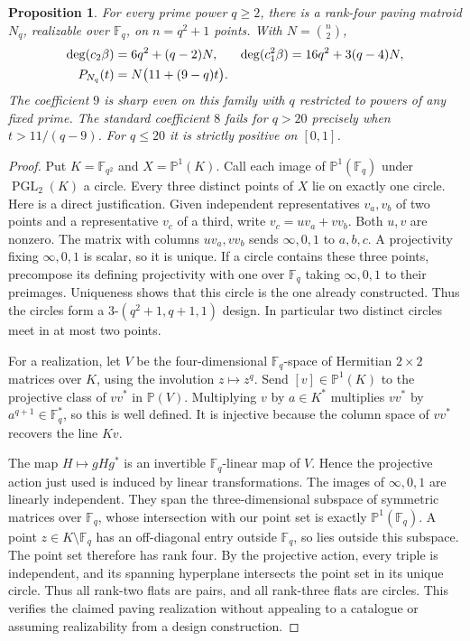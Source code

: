 \documentclass[12pt]{amsart}
\newtheorem{prop}[thm]{Proposition}
\theoremstyle{definition}
\theoremstyle{remark}
\numberwithin{equation}{section}
\begin{document}
\begin{prop}\label{en-inversive}
For every prime power $q\geq2$, there is a rank-four paving matroid $N_q$, realizable over $\mathbb F_q$, on $n=q^2+1$ points. With $N=\binom n2$,
\begin{align}\label{en-inversive-chern}
 \deg(c_2\beta)&=6q^2+(q-2)N,&
 \deg(c_1^2\beta)&=16q^2+3(q-4)N,\notag\\
 P_{N_q}(t)&=N\bigl(11+(9-q)t\bigr).
\end{align}
The coefficient $9$ is sharp even on this family with $q$ restricted to powers of any fixed prime. The standard coefficient $8$ fails for $q>20$ precisely when $t>11/(q-9)$. For $q\leq20$ it is strictly positive on $[0,1]$.
\end{prop}
\begin{proof}
Put $K=\mathbb F_{q^2}$ and $X=\mathbb P^1(K)$. Call each image of $\mathbb P^1(\mathbb F_q)$ under $\operatorname{PGL}_2(K)$ a circle. Every three distinct points of $X$ lie on exactly one circle. Here is a direct justification. Given independent representatives $v_a,v_b$ of two points and a representative $v_c$ of a third, write $v_c=u v_a+v v_b$. Both $u,v$ are nonzero. The matrix with columns $u v_a,v v_b$ sends $\infty,0,1$ to $a,b,c$. A projectivity fixing $\infty,0,1$ is scalar, so it is unique. If a circle contains these three points, precompose its defining projectivity with one over $\mathbb F_q$ taking $\infty,0,1$ to their preimages. Uniqueness shows that this circle is the one already constructed. Thus the circles form a $3$-$(q^2+1,q+1,1)$ design. In particular two distinct circles meet in at most two points.

For a realization, let $V$ be the four-dimensional $\mathbb F_q$-space of Hermitian $2\times2$ matrices over $K$, using the involution $z\mapsto z^q$. Send $[v]\in\mathbb P^1(K)$ to the projective class of $vv^*$ in $\mathbb P(V)$. Multiplying $v$ by $a\in K^*$ multiplies $vv^*$ by $a^{q+1}\in\mathbb F_q^*$, so this is well defined. It is injective because the column space of $vv^*$ recovers the line $Kv$.

The map $H\mapsto gHg^*$ is an invertible $\mathbb F_q$-linear map of $V$. Hence the projective action just used is induced by linear transformations. The images of $\infty,0,1$ are linearly independent. They span the three-dimensional subspace of symmetric matrices over $\mathbb F_q$, whose intersection with our point set is exactly $\mathbb P^1(\mathbb F_q)$. A point $z\in K\setminus\mathbb F_q$ has an off-diagonal entry outside $\mathbb F_q$, so lies outside this subspace. The point set therefore has rank four. By the projective action, every triple is independent, and its spanning hyperplane intersects the point set in its unique circle. Thus all rank-two flats are pairs, and all rank-three flats are circles. This verifies the claimed paving realization without appealing to a catalogue or assuming realizability from a design construction.


\end{proof}
\end{document}
